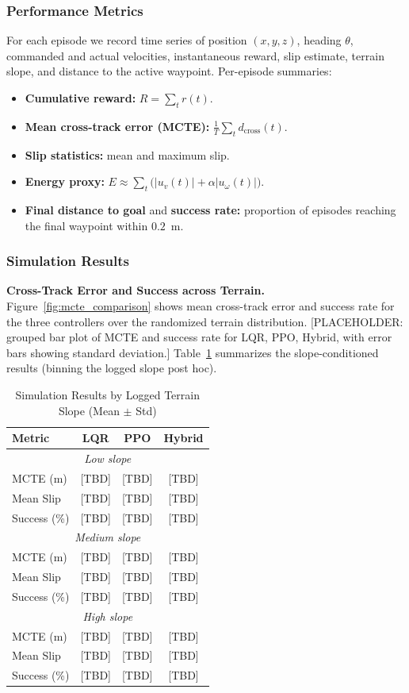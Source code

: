 \documentclass[conference]{IEEEtran}
\begin{document}
\subsubsection{Performance Metrics}
For each episode we record time series of position $(x,y,z)$, heading $\theta$, commanded and actual velocities, instantaneous reward, slip estimate, terrain slope, and distance to the active waypoint. Per-episode summaries:
\begin{itemize}
\item \textbf{Cumulative reward:} $R = \sum_{t} r(t)$.
\item \textbf{Mean cross-track error (MCTE):} $\frac{1}{T}\sum_t d_{\text{cross}}(t)$.
\item \textbf{Slip statistics:} mean and maximum slip.
\item \textbf{Energy proxy:} $E \approx \sum_t \big(|u_v(t)| + \alpha|u_\omega(t)|\big)$.
\item \textbf{Final distance to goal} and \textbf{success rate:} proportion of episodes reaching the final waypoint within $0.2$~m.
\end{itemize}

\subsubsection{Simulation Results}
\noindent\textbf{Cross-Track Error and Success across Terrain.}
Figure~\ref{fig:mcte_comparison} shows mean cross-track error and success rate for the three controllers over the randomized terrain distribution. [PLACEHOLDER: grouped bar plot of MCTE and success rate for LQR, PPO, Hybrid, with error bars showing standard deviation.] Table~\ref{tab:sim_results} summarizes the slope-conditioned results (binning the logged slope post hoc).

\begin{table}[t]
\centering
\caption{Simulation Results by Logged Terrain Slope (Mean $\pm$ Std)}
\label{tab:sim_results}
\begin{tabular}{@{}lccc@{}}
\toprule
\textbf{Metric} & \textbf{LQR} & \textbf{PPO} & \textbf{Hybrid} \\
\midrule
\multicolumn{4}{c}{\textit{Low slope}} \\
MCTE (m) & [TBD] & [TBD] & [TBD] \\
Mean Slip & [TBD] & [TBD] & [TBD] \\
Success (\%) & [TBD] & [TBD] & [TBD] \\
\midrule
\multicolumn{4}{c}{\textit{Medium slope}} \\
MCTE (m) & [TBD] & [TBD] & [TBD] \\
Mean Slip & [TBD] & [TBD] & [TBD] \\
Success (\%) & [TBD] & [TBD] & [TBD] \\
\midrule
\multicolumn{4}{c}{\textit{High slope}} \\
MCTE (m) & [TBD] & [TBD] & [TBD] \\
Mean Slip & [TBD] & [TBD] & [TBD] \\
Success (\%) & [TBD] & [TBD] & [TBD] \\
\bottomrule
\end{tabular}
\end{table}
\end{document}
